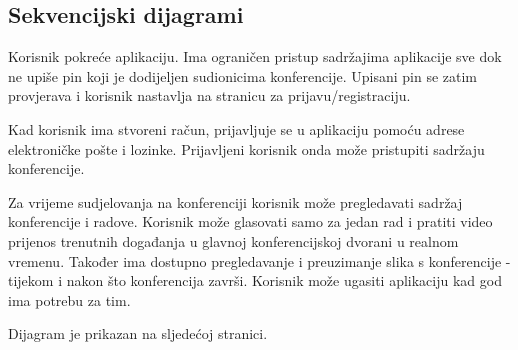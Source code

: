 			\subsection{Sekvencijski dijagrami}
				\hspace{0.5cm} Korisnik pokreće aplikaciju. Ima ograničen pristup sadržajima aplikacije sve dok ne upiše pin koji je dodijeljen sudionicima konferencije. Upisani pin se zatim provjerava i korisnik nastavlja na stranicu za prijavu/registraciju.
				
				Kad korisnik ima stvoreni račun, prijavljuje se u aplikaciju pomoću adrese elektroničke pošte i lozinke. Prijavljeni korisnik onda može pristupiti sadržaju konferencije. 
				
				Za vrijeme sudjelovanja na konferenciji korisnik može pregledavati sadržaj konferencije i radove. Korisnik može glasovati samo za jedan rad i pratiti video prijenos trenutnih događanja u glavnoj konferencijskoj dvorani u realnom vremenu. Također ima dostupno pregledavanje i preuzimanje slika s konferencije - tijekom i nakon što konferencija završi. Korisnik može ugasiti aplikaciju kad god ima potrebu za tim.
				
				Dijagram je prikazan na sljedećoj stranici.
				\eject
				
